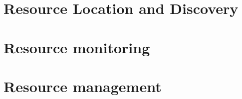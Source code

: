 \section{Resource Location and Discovery} \label{sec:res_location} 

\section{Resource monitoring} \label{sec:res_monitoring} 

\section{Resource management} \label{sec:res_management} 


